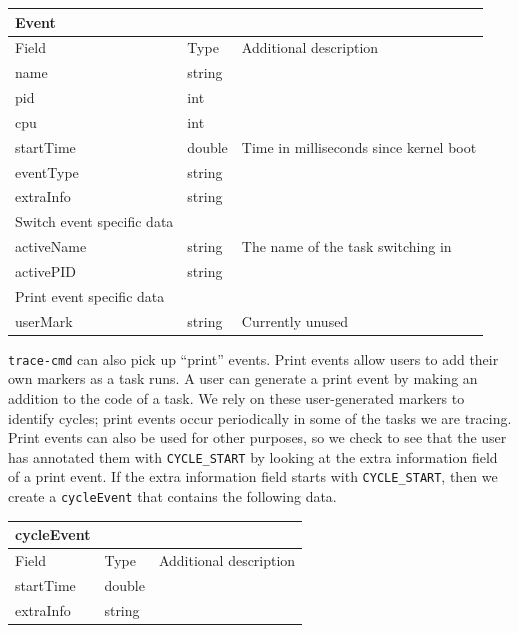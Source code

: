 \documentclass{hmcclinic}
\begin{document}
  \begin{center}
    \begin{tabular}{lll}
      Event      &        &                                        \\
      \hline
      Field     & Type   & Additional description                 \\
      \hline
      name      & string &                                        \\
      pid       & int    &                                        \\
      cpu       & int    &                                        \\
      startTime & double & Time in milliseconds since kernel boot \\
      eventType & string &                                        \\
      extraInfo & string &                                        \\
      \hline
      Switch event specific data & & \\
      \hline
      activeName & string & The name of the task switching in      \\
      activePID  & string &                                        \\
      \hline
      Print event specific data & & \\
      \hline
      userMark   & string & Currently unused
    \end{tabular}
  \end{center}

  \texttt{trace-cmd} can also pick up ``print'' events. Print events allow users to add
  their own markers as a task runs. A user can generate a print event by making
  an addition to the code of a task. We rely on these user-generated markers to
  identify cycles; print events occur periodically in some of the tasks we are
  tracing. Print events can also be used for other purposes, so we check to see
  that the user has annotated them with \texttt{CYCLE\_START} by looking at the extra
  information field of a print event. If the extra information field starts with
  \texttt{CYCLE\_START}, then we create a \texttt{cycleEvent} that contains the following data.

  \begin{center}
    \begin{tabular}{lll}
      cycleEvent      &        &                                        \\
      \hline
      Field     & Type   & Additional description                 \\
      \hline
      startTime      & double &                                        \\
      extraInfo       & string    &                                        \\
    \end{tabular}
  \end{center}
\end{document}
